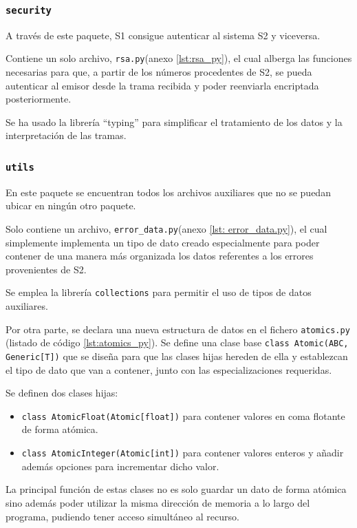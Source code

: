 \subsubsection{\texttt{security}}

A través de este paquete, \ac{S1} consigue autenticar al sistema \ac{S2} y viceversa.

Contiene un solo archivo, \texttt{rsa.py}(anexo \ref{lst:rsa_py}), el cual alberga las funciones necesarias para que, a partir de los números procedentes de \ac{S2}, se pueda autenticar al emisor desde la trama recibida y poder reenviarla encriptada posteriormente.

Se ha usado la librería ``typing'' para simplificar el tratamiento de los datos y la interpretación de las tramas.

\subsubsection{\texttt{utils}}

En este paquete se encuentran todos los archivos auxiliares que no se puedan ubicar en ningún otro paquete.

Solo contiene un archivo, \texttt{error\_data.py}(anexo \ref{lst: error_data.py}), el cual simplemente implementa un tipo de dato creado especialmente para poder contener de una manera más organizada los datos referentes a los errores provenientes de \ac{S2}.

Se emplea la librería \texttt{collections} para permitir el uso de tipos de datos auxiliares.

Por otra parte, se declara una nueva estructura de datos en el fichero \texttt{atomics.py}
(listado de código \ref{lst:atomics_py}). Se define una clase base 
\lstinline[style=Python]!class Atomic(ABC, Generic[T])! que se diseña para que las clases
hijas hereden de ella y establezcan el tipo de dato que van a contener, junto con
las especializaciones requeridas.

Se definen dos clases hijas:
\begin{itemize}
    \item \lstinline[style=Python]!class AtomicFloat(Atomic[float])! para contener
    valores en coma flotante de forma atómica.
    \item \lstinline[style=Python]!class AtomicInteger(Atomic[int])! para contener
    valores enteros y añadir además opciones para incrementar dicho valor.
\end{itemize}

La principal función de estas clases no es solo guardar un dato de forma atómica
sino además poder utilizar la misma dirección de memoria a lo largo del programa,
pudiendo tener acceso simultáneo al recurso.